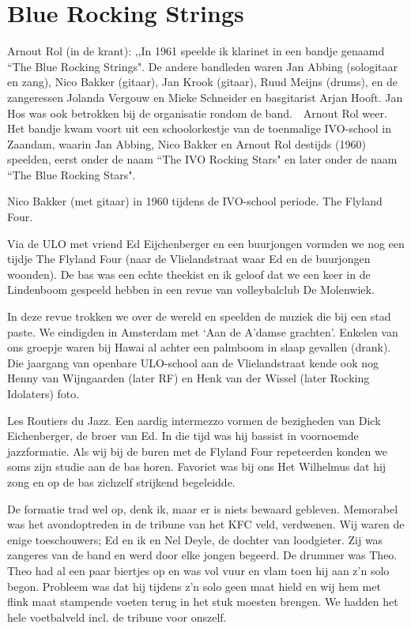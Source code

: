 \documentclass[10pt,twoside,openright]{memoir}
\begin{document}
\chapter{Blue Rocking Strings} %
\label{cha:bluerocking}

Arnout Rol (in de krant): ,,In 1961 speelde ik klarinet in een bandje genaamd ``The Blue Rocking Strings". 
De andere bandleden waren Jan Abbing (sologitaar en zang), Nico Bakker (gitaar), Jan Krook (gitaar), Ruud Meijns (drums), en de zangeressen Jolanda Vergouw en Mieke Schneider en basgitarist Arjan Hooft. Jan Hos was ook betrokken bij de organisatie rondom de band. 
 
Arnout Rol weer. Het bandje kwam voort uit een schoolorkestje van de toenmalige IVO-school in Zaandam, waarin Jan Abbing, Nico Bakker en Arnout Rol destijds (1960) speelden, eerst onder de naam ``The IVO Rocking Stars" en later onder de naam ``The Blue Rocking Stars". 

Nico Bakker (met gitaar) in 1960 tijdens de IVO-school periode.
The Flyland Four.	

Via de ULO met vriend Ed Eijchenberger en een buurjongen vormden we nog een tijdje The Flyland Four (naar de Vlielandstraat waar Ed en de buurjongen woonden). De bas was een echte theekist en ik geloof dat we een keer in de Lindenboom gespeeld hebben in een revue van volleybalclub De Molenwiek. 

In deze revue trokken we over de wereld en speelden de muziek die bij een stad paste. We eindigden in Amsterdam met ‘Aan de A’damse grachten’. Enkelen van ons groepje waren bij Hawai al achter een palmboom in slaap gevallen (drank). Die jaargang van openbare ULO-school aan de Vlielandstraat kende ook nog Henny van Wijngaarden (later RF) en Henk van der Wissel (later Rocking Idolaters) foto.

Les Routiers du Jazz. Een aardig intermezzo vormen de bezigheden van Dick Eichenberger, de broer van Ed. In die tijd was hij bassist in voornoemde jazzformatie. Als wij bij de buren met de Flyland Four repeteerden konden we soms zijn studie aan de bas horen. Favoriet was bij ons Het Wilhelmus dat hij zong en op de bas zichzelf strijkend begeleidde. 

De formatie trad wel op, denk ik, maar er is niets bewaard gebleven. Memorabel was het avondoptreden in de tribune van het KFC veld, verdwenen. Wij waren de enige toeschouwers; Ed en ik en Nel Deyle, de dochter van loodgieter. Zij was zangeres van de band en werd door elke jongen begeerd. De drummer was Theo. Theo had al een paar biertjes op en was vol vuur en vlam toen hij aan z’n solo begon. Probleem was dat hij tijdens z’n solo geen maat hield en wij hem met flink maat stampende voeten terug in het stuk moesten brengen. We hadden het hele voetbalveld incl. de tribune voor onszelf. 
\end{document}
